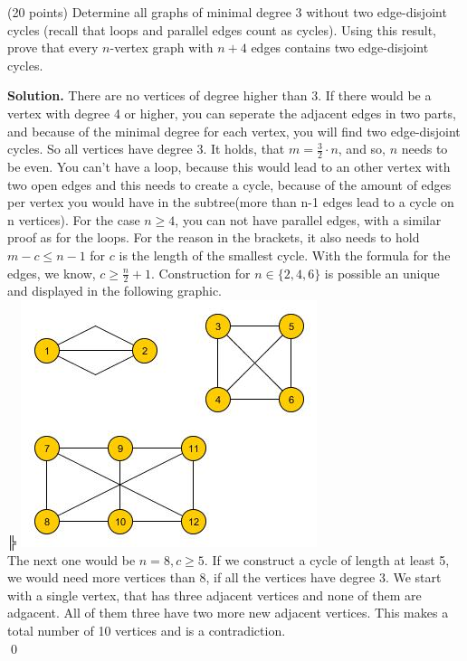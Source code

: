 \documentclass[a4paper,11pt]{amsart}
\newcounter{temp}
\newcounter{prob_counter}
\newenvironment{problem}
{\begin{list}{{\bf \arabic{prob_counter}}}{
      \usecounter{prob_counter}
      \addtolength{\labelsep}{.6ex}
      \addtolength{\itemsep}{4.3ex}
      \setlength{\leftmargin}{1.4em}}
      \setcounter{prob_counter}{\value{temp}}
}
{\setcounter{temp}{\value{prob_counter}}  
  \end{list}
}
\newenvironment{solution}{\textbf{Solution.}}{\qed}
\begin{document}
\begin{problem}
 \item (20 points) Determine all graphs of minimal degree $3$ without two edge-disjoint cycles (recall that loops and parallel edges count as cycles).
 Using this result, prove that every $n$-vertex graph with $n+4$ edges contains two edge-disjoint cycles.
\end{problem}
\begin{solution}
	There are no vertices of degree higher than 3. If there would be a vertex with degree 4 or higher, you can seperate the adjacent edges in two parts, and because of the minimal degree for each vertex, you will find two edge-disjoint cycles. So all vertices have degree 3. It holds, that $m=\frac{3}{2} \cdot n$, and so, $n$ needs to be even. You can't have a loop, because this would lead to an other vertex with two open edges and this needs to create a cycle, because of the amount of edges per vertex you would have in the subtree(more than n-1 edges lead to a cycle on n vertices). For the case $n\geq 4$, you can not have parallel edges, with a similar proof as for the loops. For the reason in the brackets, it also needs to hold $m-c \leq n-1$ for $c$ is the length of the smallest cycle. With the formula for the edges, we know, $c \geq \frac{n}{2} +1$.
	Construction for $n\in \{2, 4, 6\}$ is possible an unique and displayed in the following graphic.\\╠
	\includegraphics{A17_1} \\
	The next one would be $n=8, c\geq 5$. If we construct a cycle of length at least 5, we would need more vertices than 8, if all the vertices have degree 3. We start with a single vertex, that has three adjacent vertices and none of them are adgacent. All of them three have two more new adjacent vertices. This makes a total number of 10 vertices and is a contradiction. \\

\end{solution}
\end{document}
